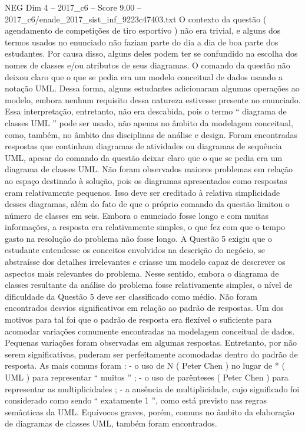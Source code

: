 \begin{textsample}{NEG Dim 4 – 2017\_c6 – Score 9.00 – 2017\_c6/enade\_2017\_sist\_inf\_9223c47403.txt}
O contexto da questão ( agendamento de competições de tiro esportivo ) não era trivial, e alguns dos termos usados no enunciado não faziam parte do dia a dia de boa parte dos estudantes.
Por causa disso, alguns deles podem ter se confundido na escolha dos nomes de classes e/ou atributos de seus diagramas.
O comando da questão não deixou claro que o que se pedia era um modelo conceitual de dados usando a notação UML.
Dessa forma, alguns estudantes adicionaram algumas operações ao modelo, embora nenhum requisito dessa natureza estivesse presente no enunciado.
Essa interpretação, entretanto, não era descabida, pois o termo “ diagrama de classes UML ” pode ser usado, não apenas no âmbito da modelagem conceitual, como, também, no âmbito das disciplinas de análise e design.
Foram encontradas respostas que continham diagramas de atividades ou diagramas de sequência UML, apesar do comando da questão deixar claro que o que se pedia era um diagrama de classes UML.
Não foram observados maiores problemas em relação ao espaço destinado à solução, pois os diagramas apresentados como respostas eram relativamente pequenos.
Isso deve ser creditado à relativa simplicidade desses diagramas, além do fato de que o próprio comando da questão limitou o número de classes em seis.
Embora o enunciado fosse longo e com muitas informações, a resposta era relativamente simples, o que fez com que o tempo gasto na resolução do problema não fosse longo.
A Questão 5 exigiu que o estudante entendesse os conceitos envolvidos na descrição do negócio, se abstraísse dos detalhes irrelevantes e criasse um modelo capaz de descrever os aspectos mais relevantes do problema.
Nesse sentido, embora o diagrama de classes resultante da análise do problema fosse relativamente simples, o nível de dificuldade da Questão 5 deve ser classificado como médio.
Não foram encontrados desvios significativos em relação ao padrão de respostas.
Um dos motivos para tal foi que o padrão de resposta era flexível o suficiente para acomodar variações comumente encontradas na modelagem conceitual de dados.
Pequenas variações foram observadas em algumas respostas.
Entretanto, por não serem significativas, puderam ser perfeitamente acomodadas dentro do padrão de resposta.
As mais comuns foram : - o uso de N ( Peter Chen ) no lugar de * ( UML ) para representar “ muitos ” ; - o uso de parênteses ( Peter Chen ) para representar as multiplicidades ; - a ausência de multiplicidade, cujo significado foi considerado como sendo “ exatamente 1 ”, como está previsto nas regras semânticas da UML.
Equívocos graves, porém, comuns no âmbito da elaboração de diagramas de classes UML, também foram encontrados.

\end{textsample}
